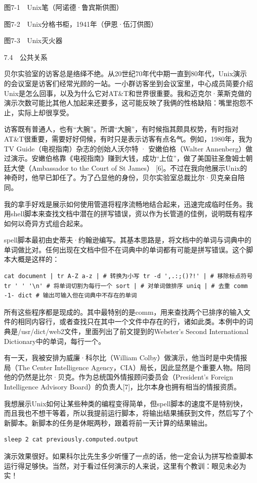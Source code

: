 \documentclass[a4paper,12pt,UTF8,twoside]{ctexbook}
\begin{document}
图7-1　Unix笔（阿诺德·鲁宾斯供图）



图7-2　Unix分格书柜，1941年（伊恩·伍汀供图）



图7-3　Unix灭火器





7.4　公共关系


贝尔实验室的访客总是络绎不绝。从20世纪70年代中期一直到80年代，Unix演示的会议室是访客们经常光顾的一站。一小群访客坐到会议室里，中心成员简要介绍Unix是怎么回事，以及为什么它对AT\&T和世界很重要。我和迈克尔·莱斯克做的演示次数可能比其他人加起来还要多，这可能反映了我俩的性格缺陷：嘴里抱怨不止，实际上却很享受。

访客既有普通人，也有“大腕”。所谓“大腕”，有时候指其颇具权势，有时指对AT\&T很重要，需要好好伺候，有时只是表示访客有点名气。例如，1980年，我为TV Guide（电视指南）杂志的创始人沃尔特 · 安嫩伯格（Walter Annenberg）做过演示。安嫩伯格靠《电视指南》赚到大钱，成功“上位”，做了美国驻圣詹姆士朝廷大使（Ambassador to the Court of St James） [6]。不过在我向他展示Unix的神奇时，他早已卸任了。为了凸显他的身份，贝尔实验室总裁比尔·贝克亲自陪同。

我的拿手好戏是展示如何使用管道将程序流畅地结合起来，迅速完成临时任务。我用shell脚本来查找文档中潜在的拼写错误，资以作为长管道的佳例，说明既有程序如何以奇异方式组合起来。

spell脚本最初由史蒂夫·约翰逊编写。其基本思路是，将文档中的单词与词典中的单词做比对。任何出现在文档中但不在词典中的单词都有可能是拼写错误。这个脚本大概是这样的：
\begin{lstlisting}
cat document | tr A-Z a-z | # 转换为小写 tr -d ',.:;()?!' | # 移除标点符号 tr ' ' '\n' # 将单词切割为每行一个 sort | # 对单词做排序 uniq | # 去重 comm -1- dict # 输出可输入但在词典中不存在的单词
\end{lstlisting}
所有这些程序都是现成的。其中最特别的是comm，用来查找两个已排序的输入文件的相同内容行，或者查找只在其中一个文件中存在的行，诸如此类。本例中的词典是/usr/dict/web2文件，里面列出了前文提到的Webster’s Second International Dictionary中的单词，每行一个。

有一天，我被安排为威廉·科尔比（William Colby）做演示，他当时是中央情报局（The Center Intelligence Agency，CIA）局长，因此显然是个重要人物。陪同他的仍然是比尔·贝克。作为总统国外情报顾问委员会（President’s Foreign Intelligence Advisory Board）的负责人[7]，比尔本身也拥有相当的情报资质。

我想展示Unix如何让某些种类的编程变得简单，但spell脚本的速度不是特别快，而且我也不想干等着，所以我提前运行脚本，将输出结果捕获到文件，然后写了个新脚本。新脚本的任务是休眠两秒，跟着将前一天计算的结果输出。
\begin{lstlisting}
sleep 2 cat previously.computed.output
\end{lstlisting}
演示效果很好。如果科尔比先生多少听懂了一点的话，他一定会认为拼写检查脚本运行得足够快。当然，对于看过任何演示的人来说，这里有个教训：眼见未必为实！
\end{document}
